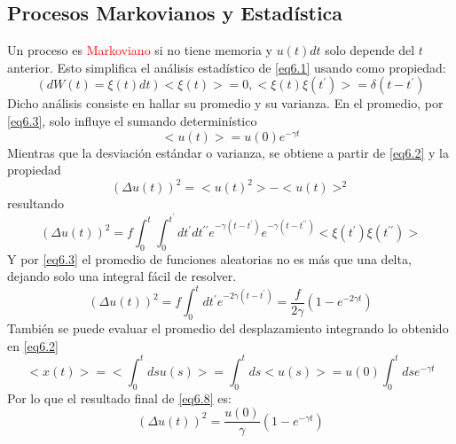 \documentclass{book}
\begin{document}
\subsection{Procesos Markovianos y Estadística}
Un proceso es \textcolor{red}{Markoviano} si no tiene memoria y $u(t)dt$ solo depende del $t$ anterior. Esto simplifica el análisis estadístico de \ref{eq6.1} usando como propiedad:
\begin{equation}\label{eq6.3}(dW(t)=\xi(t)dt) <\xi(t)>=0, <\xi(t)\xi(t^\prime)>=\delta(t-t^\prime) \end{equation}
Dicho análisis consiste en hallar su promedio y su varianza. En el promedio, por \ref{eq6.3}, solo influye el sumando determinístico
\begin{equation}\label{eq6.4}<u(t)>=u(0)e^{-\gamma t}\end{equation}
Mientras que la desviación estándar o varianza, se obtiene a partir de \ref{eq6.2} y la propiedad
\begin{equation}\label{eq6.5}(\Delta u(t))^2=<u(t)^2>-<u(t)>^2\end{equation}
resultando
\begin{equation}\label{eq6.6}(\Delta u(t))^2=f\int_0^t\int_0^{t^\prime}dt^\prime dt^{\prime\prime} e^{-\gamma(t-t^\prime)}e^{-\gamma(t-t^{\prime\prime})}<\xi(t^\prime)\xi(t^{\prime \prime})>\end{equation}
Y por \ref{eq6.3} el promedio de funciones aleatorias no es más que una delta, dejando solo una integral fácil de resolver.
\begin{equation}\label{eq6.7}(\Delta u(t))^2=f\int_0^t dt^\prime e^{-2\gamma(t-t^\prime)}=\frac{f}{2\gamma}(1-e^{-2\gamma t}) \end{equation}
También se puede evaluar el promedio del desplazamiento integrando lo obtenido en \ref{eq6.2}
\begin{equation}\label{eq6.8}<x(t)>=<\int_0^t ds u(s)>=\int_0^t ds <u(s)> =u(0)\int_0^t ds e^{-\gamma t}\end{equation}
Por lo que el resultado final de \ref{eq6.8} es:
\begin{equation}\label{eq6.9} (\Delta u(t))^2=\frac{u(0)}{\gamma}(1-e^{-\gamma t})\end{equation}
\end{document}
